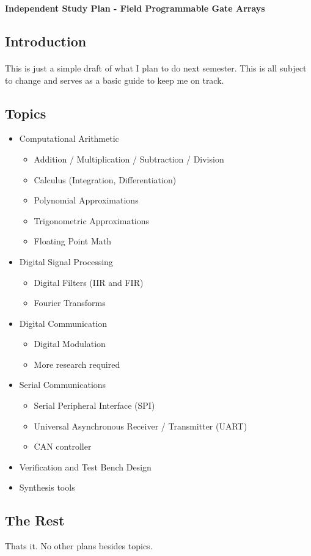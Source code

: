 \documentclass[12pt,a4paper,oneside,notitlepage]{article}
\begin{document}
\begin{center}
\large \textbf{Independent Study Plan - Field Programmable Gate Arrays}
\end{center}

\subsection*{Introduction}
\paragraph{}

This is just a simple draft of what I plan to do next semester. This is all subject to change and serves as a basic guide to keep me on track.

\subsection*{Topics}

\begin{itemize}
	\item Computational Arithmetic
		\begin{itemize}
			\item Addition / Multiplication / Subtraction / Division
			\item Calculus (Integration, Differentiation)
			\item Polynomial Approximations
			\item Trigonometric Approximations
			\item Floating Point Math
		\end{itemize}
	\item Digital Signal Processing
		\begin{itemize}
			\item Digital Filters (IIR and FIR)
			\item Fourier Transforms
		\end{itemize}
	\item Digital Communication
		\begin{itemize}
			\item Digital Modulation
			\item More research required
		\end{itemize}
	\item Serial Communications
		\begin{itemize}
			\item Serial Peripheral Interface (SPI)
			\item Universal Asynchronous Receiver / Transmitter (UART)
			\item CAN controller
		\end{itemize}
	\item Verification and Test Bench Design
	\item Synthesis tools
\end{itemize}

\subsection*{The Rest}
Thats it. No other plans besides topics. 
\end{document}
